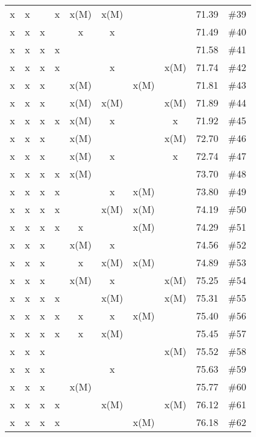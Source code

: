 \begin{longtable}{|c|c|c|c|c|c|c|c|c|c|}
 x    & x    &      & x    & x(M) & x(M) &      &      & 71.39 & \#39 \\
 x    & x    & x    &      & x    & x    &      &      & 71.49 & \#40 \\
 x    & x    & x    & x    &      &      &      &      & 71.58 & \#41 \\
 x    & x    & x    & x    &      & x    &      & x(M) & 71.74 & \#42 \\
 x    & x    & x    &      & x(M) &      & x(M) &      & 71.81 & \#43 \\
 x    & x    & x    &      & x(M) & x(M) &      & x(M) & 71.89 & \#44 \\
 x    & x    & x    & x    & x(M) & x    &      & x    & 71.92 & \#45 \\
 x    & x    & x    &      & x(M) &      &      & x(M) & 72.70 & \#46 \\
 x    & x    & x    &      & x(M) & x    &      & x    & 72.74 & \#47 \\
 x    & x    & x    & x    & x(M) &      &      &      & 73.70 & \#48 \\
 x    & x    & x    & x    &      & x    & x(M) &      & 73.80 & \#49 \\
 x    & x    & x    & x    &      & x(M) & x(M) &      & 74.19 & \#50 \\
 x    & x    & x    & x    & x    &      & x(M) &      & 74.29 & \#51 \\
 x    & x    & x    &      & x(M) & x    &      &      & 74.56 & \#52 \\
 x    & x    & x    &      & x    & x(M) & x(M) &      & 74.89 & \#53 \\
 x    & x    & x    &      & x(M) & x    &      & x(M) & 75.25 & \#54 \\
 x    & x    & x    & x    &      & x(M) &      & x(M) & 75.31 & \#55 \\
 x    & x    & x    & x    & x    & x    & x(M) &      & 75.40 & \#56 \\
 x    & x    & x    & x    & x    & x(M) &      &      & 75.45 & \#57 \\
 x    & x    & x    &      &      &      &      & x(M) & 75.52 & \#58 \\
 x    & x    & x    &      &      & x    &      &      & 75.63 & \#59 \\
 x    & x    & x    &      & x(M) &      &      &      & 75.77 & \#60 \\
 x    & x    & x    & x    &      & x(M) &      & x(M) & 76.12 & \#61 \\
 x    & x    & x    & x    &      &      & x(M) &      & 76.18 & \#62 \\

\end{longtable}
